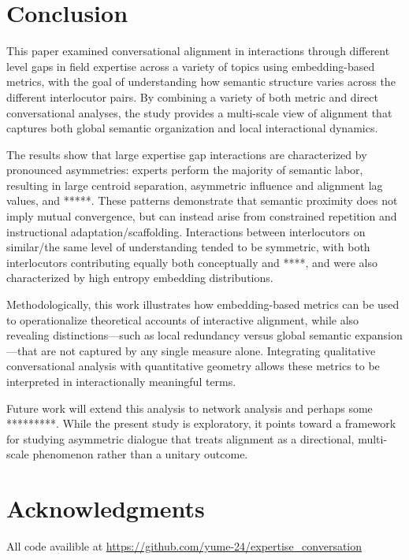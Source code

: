 \documentclass{article}
\theoremstyle{definition}
\numberwithin{table}{section}
\begin{document}
\section{Conclusion}

This paper examined conversational alignment in interactions through different level gaps in field expertise across a variety of topics using embedding-based metrics, with the goal of understanding how semantic structure varies across the different interlocutor pairs. By combining a variety of both metric and direct conversational analyses, the study provides a multi-scale view of alignment that captures both global semantic organization and local interactional dynamics.

The results show that large expertise gap interactions are characterized by pronounced asymmetries: experts perform the majority of semantic labor, resulting in large centroid separation, asymmetric influence and alignment lag values, and *****. These patterns demonstrate that semantic proximity does not imply mutual convergence, but can instead arise from constrained repetition and instructional adaptation/scaffolding. Interactions between interlocutors on similar/the same level of understanding tended to be symmetric, with both interlocutors contributing equally both conceptually and ****, and were also characterized by high entropy embedding distributions. 

Methodologically, this work illustrates how embedding-based metrics can be used to operationalize theoretical accounts of interactive alignment, while also revealing distinctions—such as local redundancy versus global semantic expansion—that are not captured by any single measure alone. Integrating qualitative conversational analysis with quantitative geometry allows these metrics to be interpreted in interactionally meaningful terms.

Future work will extend this analysis to network analysis and perhaps some *********. While the present study is exploratory, it points toward a framework for studying asymmetric dialogue that treats alignment as a directional, multi-scale phenomenon rather than a unitary outcome.

\section{Acknowledgments}

All code availible at \url{https://github.com/yume-24/expertise_conversation}

 

\end{document}
